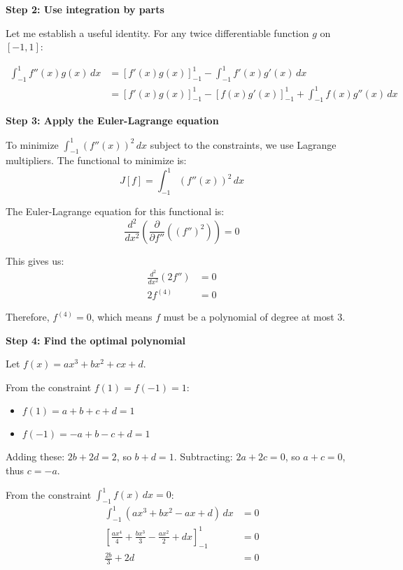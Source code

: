 \documentclass[12pt,a4paper]{article}
\theoremstyle{definition}
\begin{document}
        \textbf{Step 2: Use integration by parts}

        Let me establish a useful identity. For any twice differentiable function $g$ on $[-1,1]$:

        \begin{align}
            \int_{-1}^{1} f''(x)g(x)\,dx &= [f'(x)g(x)]_{-1}^{1} - \int_{-1}^{1} f'(x)g'(x)\,dx \\
            &= [f'(x)g(x)]_{-1}^{1} - [f(x)g'(x)]_{-1}^{1} + \int_{-1}^{1} f(x)g''(x)\,dx
        \end{align}

        \textbf{Step 3: Apply the Euler-Lagrange equation}

        To minimize $\int_{-1}^{1} (f''(x))^2\,dx$ subject to the constraints, we use Lagrange multipliers. The functional to minimize is:
        $$J[f] = \int_{-1}^{1} (f''(x))^2\,dx$$

        The Euler-Lagrange equation for this functional is:
        $$\frac{d^2}{dx^2}\left(\frac{\partial}{\partial f''}\left((f'')^2\right)\right) = 0$$

        This gives us:
        \begin{align}
            \frac{d^2}{dx^2}(2f'') &= 0 \\
            2f^{(4)} &= 0
        \end{align}

        Therefore, $f^{(4)} = 0$, which means $f$ must be a polynomial of degree at most 3.

        \textbf{Step 4: Find the optimal polynomial}

        Let $f(x) = ax^3 + bx^2 + cx + d$.

        From the constraint $f(1) = f(-1) = 1$:
        \begin{itemize}
            \item $f(1) = a + b + c + d = 1$
            \item $f(-1) = -a + b - c + d = 1$
        \end{itemize}

        Adding these: $2b + 2d = 2$, so $b + d = 1$.
        Subtracting: $2a + 2c = 0$, so $a + c = 0$, thus $c = -a$.

        From the constraint $\int_{-1}^{1} f(x)\,dx = 0$:
        \begin{align}
            \int_{-1}^{1} (ax^3 + bx^2 - ax + d)\,dx &= 0 \\
            \left[\frac{ax^4}{4} + \frac{bx^3}{3} - \frac{ax^2}{2} + dx\right]_{-1}^{1} &= 0 \\
            \frac{2b}{3} + 2d &= 0
        \end{align}
\end{document}

